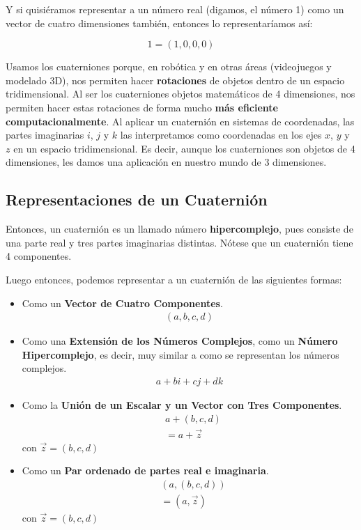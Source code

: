 Y si quisiéramos representar a un número real (digamos, el número 1) como un vector de cuatro dimensiones también, entonces lo representaríamos así:

\begin{equation}
    1 = (1,0,0,0)
\end{equation}

Usamos los cuaterniones porque, en robótica y en otras áreas (videojuegos y modelado 3D), nos permiten hacer \textbf{rotaciones} de objetos dentro de un espacio tridimensional. Al ser los cuaterniones objetos matemáticos de 4 dimensiones, nos permiten hacer estas rotaciones de forma mucho \textbf{más eficiente computacionalmente}. Al aplicar un cuaternión en sistemas de coordenadas, las partes imaginarias $i$, $j$ y $k$ las interpretamos como coordenadas en los ejes $x$, $y$ y $z$ en un espacio tridimensional. Es decir, aunque los cuaterniones son objetos de 4 dimensiones, les damos una aplicación en nuestro mundo de 3 dimensiones. 

\subsection{Representaciones de un Cuaternión}

Entonces, un cuaternión es un llamado número \textbf{hipercomplejo}, pues consiste de una parte real y tres partes imaginarias distintas. Nótese que un cuaternión tiene 4 componentes. 

Luego entonces, podemos representar a un cuaternión de las siguientes formas:

\begin{itemize}
    \item Como un \textbf{Vector de Cuatro Componentes}. 
    \begin{align*} 
        (a,b,c,d) 
    \end{align*}

    \item Como una \textbf{Extensión de los Números Complejos}, como un \textbf{Número Hipercomplejo}, es decir, muy similar a como se representan los números complejos.
    \begin{align*} 
        a+bi+cj+dk
    \end{align*}
    
    \item Como la \textbf{Unión de un Escalar y un Vector con Tres Componentes}. 
    \begin{align*} 
        &a+(b,c,d)\\
        &=a+\vec{z}
    \end{align*}
    con $\vec{z}=(b,c,d)$
    
    \item Como un \textbf{Par ordenado de partes real e imaginaria}. 
    \begin{align*} 
        &(a,(b,c,d))\\
        &=(a,\vec{z})
    \end{align*}
    con $\vec{z}=(b,c,d)$
\end{itemize}

